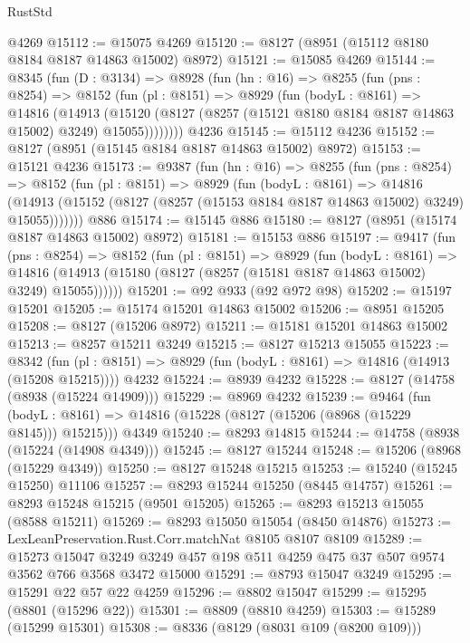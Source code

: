 \begin{lexlean}{RustStd}
\begin{coremodule}
    @4269
@15112 := @15075 @4269
@15120 := @8127 (@8951 (@15112 @8180 @8184 @8187 @14863 @15002) @8972)
@15121 := @15085 @4269
@15144 := @8345
    (fun (D : @3134) =>
    @8928
      (fun (hn : @16) =>
      @8255
        (fun (pns : @8254) =>
        @8152
          (fun (pl : @8151) =>
          @8929
            (fun (bodyL : @8161) =>
            @14816
              (@14913
                (@15120 (@8127 (@8257 (@15121 @8180 @8184 @8187 @14863 @15002) @3249) @15055))))))))
    @4236
@15145 := @15112 @4236
@15152 := @8127 (@8951 (@15145 @8184 @8187 @14863 @15002) @8972)
@15153 := @15121 @4236
@15173 := @9387
    (fun (hn : @16) =>
    @8255
      (fun (pns : @8254) =>
      @8152
        (fun (pl : @8151) =>
        @8929
          (fun (bodyL : @8161) =>
          @14816
            (@14913 (@15152 (@8127 (@8257 (@15153 @8184 @8187 @14863 @15002) @3249) @15055)))))))
    @886
@15174 := @15145 @886
@15180 := @8127 (@8951 (@15174 @8187 @14863 @15002) @8972)
@15181 := @15153 @886
@15197 := @9417
    (fun (pns : @8254) =>
    @8152
      (fun (pl : @8151) =>
      @8929
        (fun (bodyL : @8161) =>
        @14816 (@14913 (@15180 (@8127 (@8257 (@15181 @8187 @14863 @15002) @3249) @15055))))))
@15201 := @92 @933 (@92 @972 @98)
@15202 := @15197 @15201
@15205 := @15174 @15201 @14863 @15002
@15206 := @8951 @15205
@15208 := @8127 (@15206 @8972)
@15211 := @15181 @15201 @14863 @15002
@15213 := @8257 @15211 @3249
@15215 := @8127 @15213 @15055
@15223 := @8342
    (fun (pl : @8151) => @8929 (fun (bodyL : @8161) => @14816 (@14913 (@15208 @15215))))
    @4232
@15224 := @8939 @4232
@15228 := @8127 (@14758 (@8938 (@15224 @14909)))
@15229 := @8969 @4232
@15239 := @9464
    (fun (bodyL : @8161) => @14816 (@15228 (@8127 (@15206 (@8968 (@15229 @8145))) @15215)))
    @4349
@15240 := @8293 @14815
@15244 := @14758 (@8938 (@15224 (@14908 @4349)))
@15245 := @8127 @15244
@15248 := @15206 (@8968 (@15229 @4349))
@15250 := @8127 @15248 @15215
@15253 := @15240 (@15245 @15250) @11106
@15257 := @8293 @15244 @15250 (@8445 @14757)
@15261 := @8293 @15248 @15215 (@9501 @15205)
@15265 := @8293 @15213 @15055 (@8588 @15211)
@15269 := @8293 @15050 @15054 (@8450 @14876)
@15273 := LexLeanPreservation.Rust.Corr.matchNat @8105 @8107 @8109
@15289 := @15273
    @15047
    @3249
    @3249
    @457
    @198
    @511
    @4259
    @475
    @37
    @507
    @9574
    @3562
    @766
    @3568
    @3472
    @15000
@15291 := @8793 @15047 @3249
@15295 := @15291 @22 @57 @22 @4259
@15296 := @8802 @15047
@15299 := @15295 (@8801 (@15296 @22))
@15301 := @8809 (@8810 @4259)
@15303 := @15289 (@15299 @15301)
@15308 := @8336 (@8129 (@8031 @109 (@8200 @109)))

\end{coremodule}
\end{lexlean}
